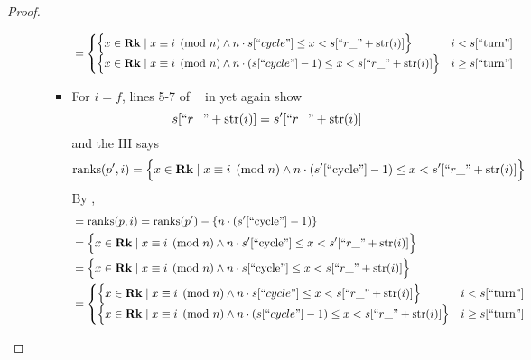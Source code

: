 \documentclass{amsart}
\DeclareMathOperator{\Rk}{\mathbf{Rk}}
\DeclareMathOperator{\zpostpop}{z_{\mathrm{post-pop}}}
\DeclareMathOperator{\ranks}{\mathrm{ranks}}
\theoremstyle{definition}
\begin{document}
\begin{proof}
\begin{enumerate}
\begin{enumerate}
\begin{itemize}
\begin{align*}
                                &=
                                    \begin{cases}
                                        \Big\{x \in \Rk \mid x \equiv i \pmod n \land n \cdot s[``cycle"] \leq x < s[``r\_" + \mathrm{str}(i)] \Big\} 
                                        & i < s[``\text{turn}"]\\
                                        \Big\{x \in \Rk \mid x \equiv i \pmod n \land n \cdot (s[``cycle"] - 1) \leq x < s[``r\_" + \mathrm{str}(i)]\Big\} 
                                        & i \geq s[``\text{turn}"]
                                    \end{cases}
                            \end{align*}

                        \item For $i = f$, lines 5-7 of $\zpostpop$ in  yet again show
                            $$s[``r\_" + \mathrm{str}(i)] = s^\prime[``r\_" + \mathrm{str}(i)]$$
                            and the IH says
                            $$
                                \ranks(p^\prime, i) = 
                                \Big\{x \in \Rk \mid x \equiv i \pmod n \land n \cdot (s^\prime[``\text{cycle}"] - 1) \leq x < s^\prime[``r\_" + \mathrm{str}(i)]\Big\} 
                            $$
                            By ,
                            \begin{align*}
                                &= \ranks(p, i) = \ranks(p^\prime) - \{n \cdot (s^\prime[``\text{cycle}"] - 1)\}\\
                                &= \Big\{x \in \Rk \mid x \equiv i \pmod n \land n \cdot s^\prime[``\text{cycle}"] \leq x < s^\prime[``r\_" + \mathrm{str}(i)]\Big\}\\
                                &= \Big\{x \in \Rk \mid x \equiv i \pmod n \land n \cdot s[``\text{cycle}"] \leq x < s[``r\_" + \mathrm{str}(i)]\Big\}\\
                                &=
                                    \begin{cases}
                                        \Big\{x \in \Rk \mid x \equiv i \pmod n \land n \cdot s[``cycle"] \leq x < s[``r\_" + \mathrm{str}(i)] \Big\} 
                                        & i < s[``\text{turn}"]\\
                                        \Big\{x \in \Rk \mid x \equiv i \pmod n \land n \cdot (s[``cycle"] - 1) \leq x < s[``r\_" + \mathrm{str}(i)]\Big\} 
                                        & i \geq s[``\text{turn}"]
                                    \end{cases}
                            \end{align*}
                    \end{itemize}
            \end{enumerate}
    \end{enumerate}
\end{proof}
\end{document}

